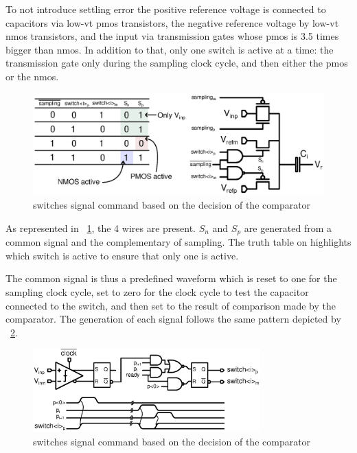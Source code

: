 To not introduce settling error the positive reference voltage is connected to capacitors via low-vt pmos transistors, the negative reference voltage by low-vt nmos transistors, and the input via transmission gates whose pmos is 3.5 times bigger than nmos. In addition to that, only one switch is active at a time: the transmission gate only during the sampling clock cycle, and then either the pmos or the nmos.

\begin{figure}[htp]
	\centering
	\includegraphics[width=\textwidth]{Chapter4/Figs/sar-switches-command-simp.ps}
	\caption{switches signal command based on the decision of the comparator}
	\label{fig:switches-command}
\end{figure}

As represented in \figurename~\ref{fig:switches-command}, the 4 wires are present. \(S_n\) and \(S_p\) are generated from a common signal and the complementary of sampling. The truth table on highlights which switch is active to ensure that only one is active.

The common signal is thus a predefined waveform which is reset to one for the sampling clock cycle, set to zero for the clock cycle to test the capacitor connected to the switch, and then set to the result of comparison made by the comparator. The generation of each signal follows the same pattern depicted by \figurename~\ref{fig:comp-decision-switches}.

\begin{figure}[htp]
	\centering
	\includegraphics[width=0.78\textwidth]{Chapter4/Figs/comp-decisin-switches.ps}
	\caption{switches signal command based on the decision of the comparator}
	\label{fig:comp-decision-switches}
\end{figure}

